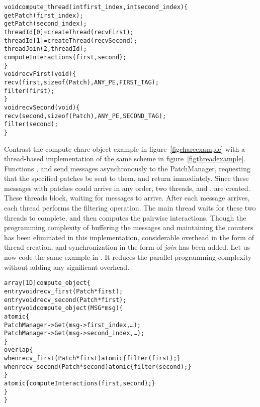 \begin{center}
\begin{alltt}
void compute_thread(int first_index, int second_index)\{
    getPatch(first_index);
    getPatch(second_index);
    threadId[0] = createThread(recvFirst);
    threadId[1] = createThread(recvSecond);
    threadJoin(2, threadId);
    computeInteractions(first, second);
\}
void recvFirst(void)\{
    recv(first, sizeof(Patch), ANY_PE, FIRST_TAG);
    filter(first);
\}
void recvSecond(void)\{
    recv(second, sizeof(Patch), ANY_PE, SECOND_TAG);
    filter(second);
\}
\end{alltt}
\end{center}

Contrast the compute chare-object example in figure~\ref{figchareexample} with
a thread-based implementation of the same scheme in
figure~\ref{figthreadexample}. Functions , and  send
messages asynchronously to the PatchManager, requesting that the specified
patches be sent to them, and return immediately. Since these messages with
patches could arrive in any order, two threads,  and
, are created. These threads block, waiting for messages to
arrive. After each message arrives, each thread performs the filtering
operation. The main thread waits for these two threads to complete, and then
computes the pairwise interactions. Though the programming complexity of
buffering the messages and maintaining the counters has been eliminated in this
implementation, considerable overhead in the form of thread creation, and
synchronization in the form of {\em join} has been added. Let us now code the
same example in \sdag. It reduces the parallel programming complexity without
adding any significant overhead.

\begin{center}
\begin{alltt}
array[1D] compute_object \{
    entry void recv_first(Patch *first);
    entry void recv_second(Patch *first);
    entry void compute_object(MSG *msg)\{
        atomic \{
            PatchManager->Get(msg->first_index,\dots);
            PatchManager->Get(msg->second_index,\dots);
        \}
        overlap \{
            when recv_first(Patch *first) atomic \{ filter(first); \}
            when recv_second(Patch *second) atomic \{ filter(second); \}
        \}
        atomic \{ computeInteractions(first, second); \}
    \}
\}
\end{alltt}
\end{center}

